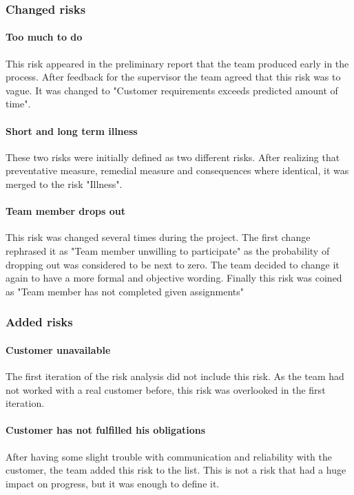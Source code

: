 \subsubsection{Changed risks}
\paragraph{Too much to do}
This risk appeared in the preliminary report that the team produced early in the process. After feedback for the supervisor the team agreed that this risk was to vague. It was changed to "Customer requirements exceeds predicted amount of time".

\paragraph{Short and long term illness}
These two risks were initially defined as two different risks. After realizing that preventative measure, remedial measure and consequences where identical, it was merged to the risk "Illness".

\paragraph{Team member drops out}
This risk was changed several times during the project. The first change rephrased it as "Team member unwilling to participate" as the probability of dropping out was considered to be next to zero. The team decided to change it again to have a more formal and objective wording. Finally this risk was coined as "Team member has not completed given assignments"

\subsubsection{Added risks}
\paragraph{Customer unavailable}
The first iteration of the risk analysis did not include this risk. As the team had not worked with a real customer before, this risk was overlooked in the first iteration.

\paragraph{Customer has not fulfilled his obligations}
After having some slight trouble with communication and reliability with the customer, the team added this risk to the list. This is not a risk that had a huge impact on progress, but it was enough to define it.

